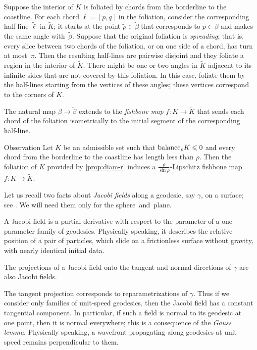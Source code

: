 \documentclass[a4paper,10pt]{article}
\begin{document}
Suppose the interior of $K$ is foliated by chords from the borderline to the coastline.
For each chord $\ell=[p,q]$ in the foliation, consider the corresponding half-line $\tilde \ell$ in $\tilde K$;
it starts at the point $\tilde p\in\tilde \beta$ that corresponds to $p\in\beta$ and makes the same angle with~$\tilde \beta$.
Suppose that the original foliation is \emph{spreading}; that is, every slice between two chords of the foliation, or on one side of a chord, has turn at most~$\pi$.
Then the resulting half-lines are pairwise disjoint and they foliate a region in the interior of $\tilde K$.
There might be one or two angles in $\tilde K$ adjacent to its infinite sides that are not covered by this foliation.
In this case, foliate them by the half-lines starting from the vertices of these angles; these vertices correspond to the corners of $K$.

The natural map $\beta\to\tilde\beta$ extends to the \emph{fishbone map} $f\colon K\to \tilde K$ that sends each chord of the foliation isometrically to the initial segment of the corresponding half-line.

\begin{thm}{Observation}\label{obs:fishbone}
Let $K$ be an admissible set such that $\mathrm{balance}_\rho K\leqslant 0$ and every chord from the borderline to the coastline has length less than $\rho$.
Then the foliation of $K$ provided by \ref{prop:diam-r} induces a $\tfrac \rho{\sin \rho}$-Lipschitz fishbone map $f\colon K\to \tilde K$.
\end{thm}

Let us recall two facts about \emph{Jacobi fields} along a geodesic, say $\gamma$, on a surface; see \cite[chap. 5 § 9]{tapp}.
We will need them only for the sphere~and~plane.

A Jacobi field is a partial derivative with respect to the parameter of a one-parameter family of geodesics.
Physically speaking, it describes the relative position of a pair of particles, which slide on a frictionless surface without gravity, with nearly identical initial data.

The projections of a Jacobi field onto the tangent and normal directions of $\gamma$ are also Jacobi fields.

The tangent projection corresponds to reparametrizations of $\gamma$.
Thus if we consider only families of unit-speed geodesics, then the Jacobi field has a constant tangential component.
In particular, if such a field is normal to its geodesic at one point, then it is normal everywhere;
this is a consequence of the \emph{Gauss lemma}.
Physically speaking, a wavefront propagating along geodesics at unit speed remains perpendicular to them.
\end{document}
